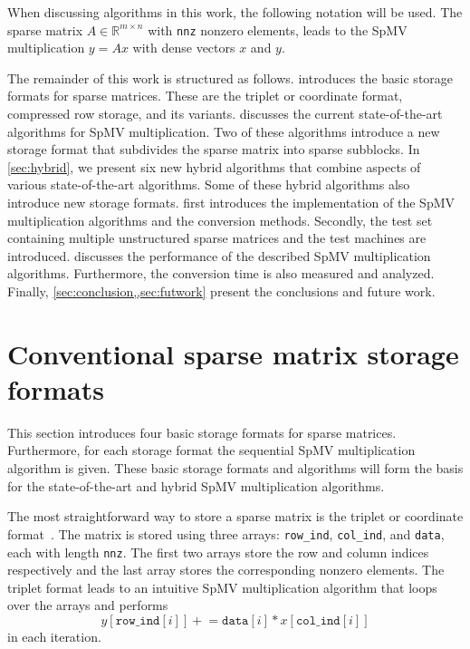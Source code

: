 \documentclass{siamart220329}
\begin{document}
When discussing algorithms in this work, the following notation will be used. The sparse matrix $A \in \mathbb{R}^{m \times n}$ with \texttt{nnz} nonzero elements, leads to the SpMV multiplication $y = Ax$ with dense vectors $x$ and $y$.

The remainder of this work is structured as follows.  introduces the basic storage formats for sparse matrices. These are the triplet or coordinate format, compressed row storage, and its variants.  discusses the current state-of-the-art algorithms for SpMV multiplication. Two of these algorithms introduce a new storage format that subdivides the sparse matrix into sparse subblocks. In \cref{sec:hybrid}, we present six new hybrid algorithms that combine aspects of various state-of-the-art algorithms. Some of these hybrid algorithms also introduce new storage formats.  first introduces the implementation of the SpMV multiplication algorithms and the conversion methods. Secondly, the test set containing multiple unstructured sparse matrices and the test machines are introduced.  discusses the performance of the described SpMV multiplication algorithms. Furthermore, the conversion time is also measured and analyzed. Finally, \cref{sec:conclusion,,sec:futwork} present the conclusions and future work.

\section{Conventional sparse matrix storage formats}\label{sec:convStorage}
This section introduces four basic storage formats for sparse matrices. Furthermore, for each storage format the sequential SpMV multiplication algorithm is given. These basic storage formats and algorithms will form the basis for the state-of-the-art and hybrid SpMV multiplication algorithms.

The most straightforward way to store a sparse matrix is the triplet or coordinate format~\cite{sparse-matrix-chapter}. The matrix is stored using three arrays: \texttt{row\_ind}, \texttt{col\_ind}, and \texttt{data}, each with length \texttt{nnz}. The first two arrays store the row and column indices respectively and the last array stores the corresponding nonzero elements. The triplet format leads to an intuitive SpMV multiplication algorithm that loops over the arrays and performs
\begin{equation}
    y[\texttt{row\_ind}[i]] \mathrel{+}= \texttt{data}[i]*x[\texttt{col\_ind}[i]]
\end{equation}
in each iteration.
\end{document}
